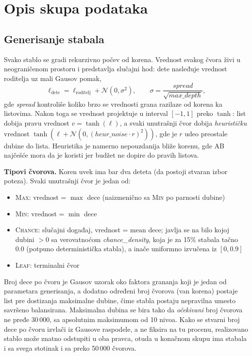 \documentclass[12pt, a4paper]{article}
\begin{document}
\section{Opis skupa podataka}

\subsection{Generisanje stabala}

Svako stablo se gradi rekurzivno počev od korena. Vrednost svakog čvora živi u
neograničenom prostoru i predstavlja slučajni hod: dete nasleđuje vrednost roditelja uz mali Gausov pomak,
\[
\ell_{\text{dete}} = \ell_{\text{roditelj}} + \mathcal{N}(0, \sigma^2), \qquad
\sigma = \frac{\mathit{spread}}{\sqrt{\mathit{max\_depth}}},
\]
gde \textit{spread} kontroliše koliko brzo se vrednosti grana razilaze od korena ka listovima.
Nakon toga se vrednost projektuje u interval $[-1, 1]$ preko $\tanh$: list
dobija pravu vrednost $v = \tanh(\ell)$, a svaki unutrašnji čvor dobija \textit{heurističku}
vrednost $\tanh(\ell + \mathcal{N}(0, (\mathit{heur\_noise} \cdot r)^2))$, gde je $r$ udeo
preostale dubine do lista. Heuristika je namerno nepouzdanija bliže korenu, gde AB najčešće
mora da je koristi jer budžet ne dopire do pravih listova.

\textbf{Tipovi čvorova.} Koren uvek ima bar dva deteta (da postoji stvaran izbor poteza).
Svaki unutrašnji čvor je jedan od:
\begin{itemize}[noitemsep]
    \item \textsc{Max}: vrednost = $\max$ dece (naizmenično sa \textsc{Min} po parnosti dubine)
    \item \textsc{Min}: vrednost = $\min$ dece
    \item \textsc{Chance}: slučajni događaj, vrednost = $\text{mean}$ dece; javlja se na
    bilo kojoj dubini $> 0$ sa verovatnoćom \textit{chance\_density}, koja je za 15\% stabala
    tačno $0.0$ (potpuno deterministička stabla), a inače uniformno izvučena iz $[0, 0.9]$
    \item \textsc{Leaf}: terminalni čvor
\end{itemize}
Broj dece po čvoru je Gausov uzorak oko faktora grananja koji je jedan od parametara generisanja, a dodatno određeni broj čvorova (van korena)
postaje list pre dostizanja maksimalne dubine, čime stabla postaju nepravilna umesto savršeno
balansirana. Maksimalna dubina se bira tako da \textit{očekivani} broj čvorova ne pređe 30\,000, sa apsolutnim maksimumom od 10 nivoa. Kako se stvarni broj
dece po čvoru izvlači iz Gausove raspodele, a ne fiksira na tu procenu, realizovano stablo
može znatno odstupiti u oba pravca, otuda u konačnom skupu ima stabala i sa svega stotinak i
sa preko 50\,000 čvorova.
\end{document}
